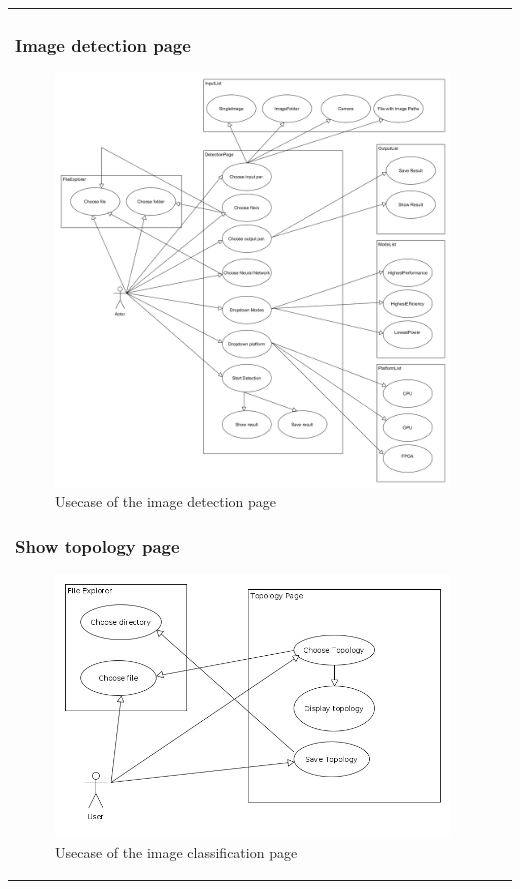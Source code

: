 \documentclass[parskip=full]{scrartcl}
\begin{document}
\begin{tabular}{p{2cm}p{12cm}}
\subsubsection{Image detection page}
\begin{figure}[htb!]
\centering
\includegraphics[width=\textwidth]{objectDetectionUsecase}
\caption{Usecase of the image detection page}
\end{figure}
\newpage
\subsubsection{Show topology page}
\begin{figure}[htb!]
\centering
\includegraphics[width=\textwidth]{ShowTopoUsecase}
\caption{Usecase of the image classification page}
\end{figure}
\newpage


\end{tabular}
\end{document}
